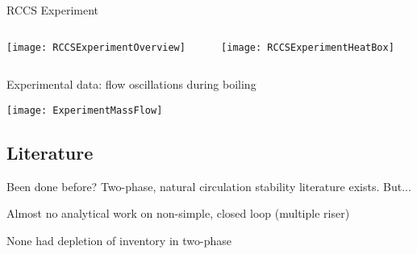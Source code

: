     \begin{frame}[c]{RCCS Experiment}
        \begin{columns}[c]
            \begin{column}{0.35\textwidth}
                \texttt{[image: RCCSExperimentOverview]}
            \end{column}
            \begin{column}{0.60\textwidth}
                \texttt{[image: RCCSExperimentHeatBox]}
            \end{column}
        \end{columns}
    \end{frame}
    
    
    
    \begin{frame}[c]{Experimental data: flow oscillations during boiling}
        \begin{center}
            \texttt{[image: ExperimentMassFlow]}
        \end{center}
    \end{frame}



    \subsection{Literature}
    \begin{frame}{Been done before?}
        Two-phase, natural circulation stability literature exists.
        \vspace{1em}
        But...
        \begin{Itemize}
            \item{Almost no analytical work on non-simple, closed loop (multiple riser)}
            \item{None had depletion of inventory in two-phase}
        \end{Itemize}
    \end{frame}
